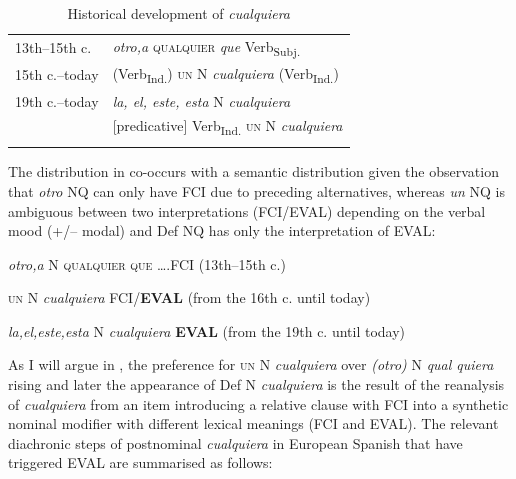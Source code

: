 \begin{table}
\begin{tabularx}{\textwidth}{@{}lX@{}}
\lsptoprule
{13th–15th c.} & \textit{otro,a} \textsc{qualquier} \textit{que} Verb\textsubscript{Subj.} \\
{15th c.–today} & (Verb\textsubscript{Ind.}) \textsc{un} N \textit{cualquiera} (Verb\textsubscript{Ind.}) \\
{19th c.–today} & \textit{la, el, este, esta} N \textit{cualquiera} \\
                       & [predicative] Verb\textsubscript{Ind.} \textsc{un} N \textit{cualquiera} \\
\lspbottomrule
\end{tabularx}
\caption{Historical development of \textit{cualquiera} \label{ex:key:301}}
\end{table}


The distribution in  co-occurs with a semantic distribution given the observation that \textit{otro} NQ can only have FCI due to preceding alternatives, whereas \textit{un} NQ is ambiguous between two interpretations (FCI/EVAL) depending on the verbal mood (+/– modal) and Def NQ has only the interpretation of EVAL:


\ea \label{ex:key:302} %
  \textit{otro,a} N \textsc{qualquier} \textsc{que} ….FCI (13th–15th c.)

      \textsc{un} N \textit{cualquiera} FCI/\textbf{EVAL} (from the 16th c. until today)

   \textit{la,el,este,esta} N \textit{cualquiera} \textbf{EVAL} (from the 19th c. until today)
\z

As I will argue in , the preference for \textsc{un} N \textit{cualquiera} over \textit{(otro)} N \textit{qual quiera} rising and later the appearance of Def N \textit{cualquiera} is the result of the reanalysis of \textit{cualquiera} from an item introducing a relative clause with FCI into a synthetic nominal modifier with different lexical meanings (FCI and EVAL).
 The relevant diachronic steps of postnominal \textit{cualquiera} in European Spanish that have triggered EVAL are summarised as follows:


